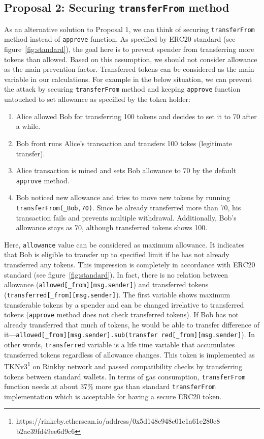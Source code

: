\subsection{Proposal 2: Securing \texttt{transferFrom} method}

As an alternative solution to Proposal 1, we can think of securing \texttt{transferFrom} method instead of \texttt{approve} function. As specified by ERC20 standard (see figure~\ref{fig:standard}), the goal here is to prevent spender from transferring more tokens than allowed. Based on this assumption, we should not consider allowance as the main prevention factor. Transferred tokens can be considered as the main variable in our calculations. For example in the below situation, we can prevent the attack by securing \texttt{transferFrom} method and keeping \texttt{approve} function untouched to set allowance as specified by the token holder:
\begin{enumerate}
	\item Alice allowed Bob for transferring 100 tokens and decides to set it to 70 after a while.
	\item Bob front runs Alice’s transaction and transfers 100 tokes (legitimate transfer).
	\item Alice transaction is mined and sets Bob allowance to 70 by the default \texttt{approve} method.
	\item Bob noticed new allowance and tries to move new tokens by running \texttt{transferFrom(\_Bob,70)}. Since he already transferred more than 70, his transaction fails and prevents multiple withdrawal. Additionally, Bob’s allowance stays as 70, although transferred tokens shows 100.
\end{enumerate}
Here, \texttt{allowance} value can be considered as maximum allowance. It indicates that Bob is eligible to transfer up to specified limit if he has not already transferred any tokens. This impression is completely in accordance with ERC20 standard (see figure~\ref{fig:standard}). In fact, there is no relation between allowance (\texttt{allowed[\_from][msg.sender]}) and transferred tokens (\texttt{transferred[\_from][msg.sender]}). The first variable shows maximum transferable tokens by a spender and can be changed irrelative to transferred tokens (\ie \texttt{approve} method does not check transferred tokens). If Bob has not already transferred that much of tokens, he would be able to transfer difference of it---\texttt{allowed[\_from][msg.sender].sub(transfer red[\_from][msg.sender]}). In other words, \texttt{transferred} variable is a life time variable that accumulates transferred tokens regardless of allowance changes. This token is implemented as TKNv3\footnote{https://rinkeby.etherscan.io/address/0x5d148c948c01e1a61e280c8 b2ac39fd49ee6d9c6} on Rinkby network and passed compatibility checks by transferring tokens between standard wallets. In terms of gas consumption, \texttt{transferFrom} function needs at about 37\% more gas than standard \texttt{transferFrom} implementation which is acceptable for having a secure ERC20 token.

